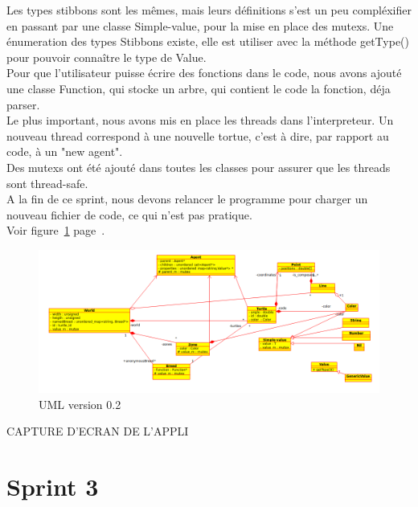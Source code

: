 Les types stibbons sont les mêmes, mais leurs définitions s'est un peu compléxifier en passant par une classe Simple-value, pour la mise en place des mutexs. Une énumeration des types Stibbons existe, elle est utiliser avec la méthode getType() pour pouvoir connaître le type de Value.\\
Pour que l'utilisateur puisse écrire des fonctions dans le code, nous avons ajouté une classe Function, qui stocke un arbre, qui contient le code la fonction, déja parser.\\
Le plus important, nous avons mis en place les threads dans l'interpreteur. Un nouveau thread correspond à une nouvelle tortue, c'est à dire, par rapport au code, à un "new agent".\\ Des mutexs ont été ajouté dans toutes les classes pour assurer que les threads sont thread-safe.\\
A la fin de ce sprint, nous devons relancer le programme pour charger un nouveau fichier de code, ce qui n'est pas pratique.\\
Voir figure~\ref{v0.2} page~\pageref{v0.2}.
\begin{figure}[h]
\caption{\label{v0.2} UML version 0.2}
\includegraphics[scale=0.45]{doc/report/uml/v02reel.png}
\end{figure}
CAPTURE D'ECRAN DE L'APPLI
\newpage

\section{Sprint 3}

